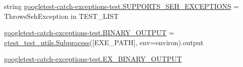 \begin{DoxyCompactItemize}
\item 
string \mbox{\hyperlink{namespacegoogletest-catch-exceptions-test_ae72da371134ddf921c9edf36788f7ecd}{googletest-\/catch-\/exceptions-\/test.\+S\+U\+P\+P\+O\+R\+T\+S\+\_\+\+S\+E\+H\+\_\+\+E\+X\+C\+E\+P\+T\+I\+O\+NS}} = \textquotesingle{}Throws\+Seh\+Exception\textquotesingle{} in T\+E\+S\+T\+\_\+\+L\+I\+ST
\item 
\mbox{\hyperlink{namespacegoogletest-catch-exceptions-test_ac02efc4cd44ac24ba2c8d34a0e787693}{googletest-\/catch-\/exceptions-\/test.\+B\+I\+N\+A\+R\+Y\+\_\+\+O\+U\+T\+P\+UT}} = \mbox{\hyperlink{classgtest__test__utils_1_1Subprocess}{gtest\+\_\+test\+\_\+utils.\+Subprocess}}(\mbox{[}E\+X\+E\+\_\+\+P\+A\+TH\mbox{]}, env=environ).output
\item 
\mbox{\hyperlink{namespacegoogletest-catch-exceptions-test_a291a1ed9c774889e37aab2e7a526fc80}{googletest-\/catch-\/exceptions-\/test.\+E\+X\+\_\+\+B\+I\+N\+A\+R\+Y\+\_\+\+O\+U\+T\+P\+UT}}
\end{DoxyCompactItemize}
